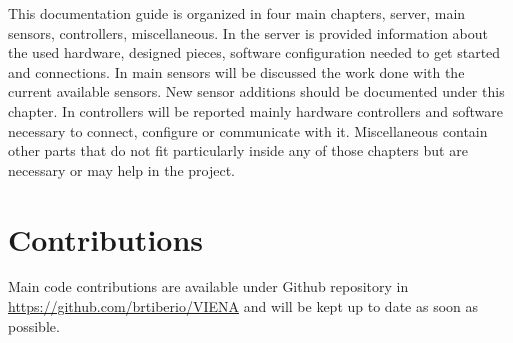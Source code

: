 This documentation guide is organized in four main chapters, server, main sensors, controllers, miscellaneous.
In the server is provided information about the used hardware, designed pieces, software configuration needed to get started and connections.
In main sensors will be discussed the work done with the current available sensors. New sensor additions should be documented under this chapter.
In controllers will be reported mainly hardware controllers and software necessary to connect, configure  or communicate with it.
Miscellaneous contain other parts that do not fit particularly inside any of those chapters but are necessary or may help in the project.

 

\section{Contributions}
\label{section:contributions}

Main code contributions are available under Github repository in \url{https://github.com/brtiberio/VIENA} and will be kept up to date as soon as possible.





